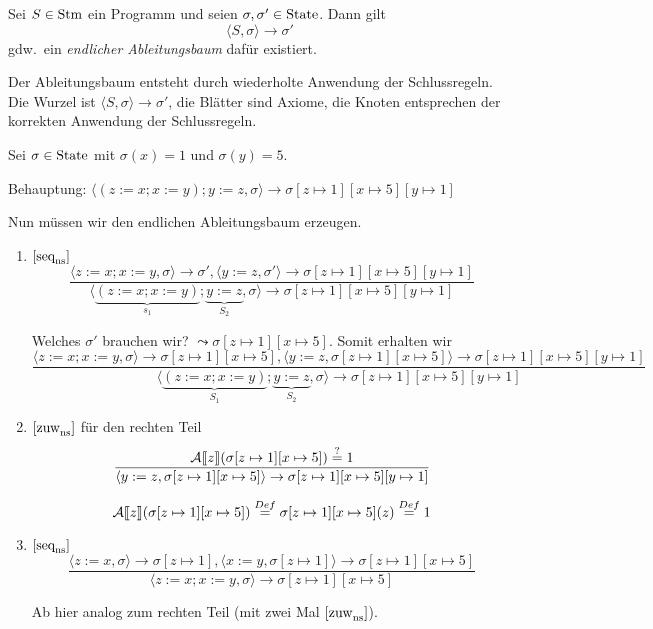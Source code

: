 \begin{definition}
    Sei $S \in \operatorname{Stm}$ ein Programm und seien $\sigma, \sigma' \in \operatorname{State}$. Dann gilt
    \[
    \langle S, \sigma \rangle \to \sigma'
    \]
    gdw.\ ein \emph{endlicher Ableitungsbaum} dafür existiert.

    Der Ableitungsbaum entsteht durch wiederholte Anwendung der Schlussregeln. Die Wurzel ist $\langle S, \sigma \rangle \to \sigma'$, die Blätter sind Axiome, die Knoten entsprechen der korrekten Anwendung der Schlussregeln.
\end{definition}

\begin{example}
    Sei $\sigma \in \operatorname{State}$ mit $\sigma(x) = 1$ und $\sigma(y) = 5$.

    Behauptung: $\langle (z := x; x := y); y := z, \sigma \rangle \to \sigma[z \mapsto 1][x \mapsto 5][y \mapsto 1]$

    Nun müssen wir den endlichen Ableitungsbaum erzeugen.


    \begin{enumerate}
        \item $[\text{seq}_{\text{ns}}^{}]$
            \[
            \frac{\langle z := x; x := y, \sigma \rangle \to \sigma', \langle y := z, \sigma' \rangle \to \sigma[z \mapsto 1][x \mapsto 5][y \mapsto 1]}{\langle \underbrace{(z := x; x := y)}_{s_1}; \underbrace{y := z}_{S_2}, \sigma \rangle \to \sigma[z \mapsto 1][x \mapsto 5][y \mapsto 1]}
            \]

            Welches $\sigma'$ brauchen wir? $\leadsto \sigma[z \mapsto 1][x \mapsto 5]$. Somit erhalten wir
            \[
            \frac{\langle z := x; x := y, \sigma \rangle \to \sigma[z \mapsto 1][x \mapsto 5], \langle y := z, \sigma[z \mapsto 1][x \mapsto 5] \rangle \to \sigma[z \mapsto 1][x \mapsto 5][y \mapsto 1]}{\langle \underbrace{(z := x; x := y)}_{S_1}; \underbrace{y := z}_{S_2}, \sigma \rangle \to \sigma[z \mapsto 1][x \mapsto 5][y \mapsto 1]}
            \]

        \item $[\text{zuw}_{\text{ns}}^{}]$ für den rechten Teil
            \[
            \frac{\mathcal{A}\mathrm{[}\kern-.14em\mathrm{[} z\mathrm{]}\kern-.14em\mathrm{]}(\sigma[z \mapsto 1][x \mapsto 5]) \overset{?}{=} 1}{\langle y := z, \sigma[z \mapsto 1][x \mapsto 5] \rangle \to \sigma[z \mapsto 1][x \mapsto 5][y \mapsto 1]}
            \]

            \[
            \mathcal{A}\mathrm{[}\kern-.14em\mathrm{[} z\mathrm{]}\kern-.14em\mathrm{]}(\sigma[z \mapsto 1][x \mapsto 5]) \overset{Def}{=} \sigma[z \mapsto 1][x \mapsto 5](z) \overset{Def}{=} 1
            \]

        \item $[\text{seq}_{\text{ns}}^{}]$
            \[
            \frac{\langle z := x, \sigma \rangle \to \sigma[z \mapsto 1], \langle x := y, \sigma[z \mapsto 1] \rangle \to \sigma[z \mapsto 1][x \mapsto 5]}{\langle z := x; x := y, \sigma \rangle \to \sigma[z \mapsto 1][x \mapsto 5]}
            \]

            Ab hier analog zum rechten Teil (mit zwei Mal $[\text{zuw}_{\text{ns}}^{}]$).
    \end{enumerate}
\end{example}


